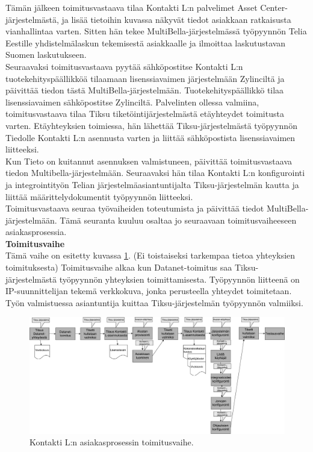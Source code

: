 \documentclass[finnish,12pt,a4paper,pdftex]{article}
\begin{document}
Tämän jälkeen toimitusvastaava tilaa Kontakti L:n palvelimet Asset Center-järjestelmästä, ja lisää tietoihin kuvassa näkyvät tiedot asiakkaan ratkaisusta vianhallintaa varten. Sitten hän tekee MultiBella-järjestelmässä työpyynnön Telia Eestille yhdistelmälaskun tekemisestä asiakkaalle ja ilmoittaa laskutustavan Suomen laskutukseen.\\

Seuraavaksi toimitusvastaava pyytää sähköpostitse Kontakti L:n tuotekehityspäällikköä tilaamaan lisenssiavaimen järjestelmään Zylinciltä ja päivittää tiedon tästä MultiBella-järjestelmään. Tuotekehityspäällikkö tilaa lisenssiavaimen sähköpostitse Zylinciltä. Palvelinten ollessa valmiina, toimitusvastaava tilaa Tiksu tiketöintijärjestelmästä etäyhteydet toimitusta varten. Etäyhteyksien toimiessa, hän lähettää Tiksu-järjestelmästä työpyynnön Tiedolle Kontakti L:n asennusta varten ja liittää sähköpostista lisenssiavaimen liitteeksi.\\

Kun Tieto on kuitannut asennuksen valmistuneen, päivittää toimitusvastaava tiedon Multibella-järjestelmään. Seuraavaksi hän tilaa Kontakti L:n konfigurointi ja integrointityön Telian järjestelmäasiantuntijalta Tiksu-järjestelmän kautta ja liittää määrittelydokumentit työpyynnön liitteeksi.\\

Toimitusvastaava seuraa työvaiheiden toteutumista ja päivittää tiedot MultiBella-järjestelmään. Tämä seuranta kuuluu osaltaa jo seuraavaan toimitusvaiheeseen asiakasprosessia.\\

\textbf{Toimitusvaihe}\\


Tämä vaihe on esitetty kuvassa \ref{fig:toimitus}. (Ei toistaiseksi tarkempaa tietoa yhteyksien toimituksesta) Toimitusvaihe alkaa kun Datanet-toimitus saa Tiksu-järjestelmästä työpyynnön yhteyksien toimittamisesta. Työpyynnön liitteenä on IP-suunnittelijan tekemä verkkokuva, jonka perusteella yhteydet toimitetaan. Työn valmistuessa asiantuntija kuittaa Tiksu-järjestelmän työpyynnön valmiiksi.\\

\begin{figure}[!h]
    \centering
    \includegraphics[scale=0.3]{images/toimitus.pdf}
    \caption{Kontakti L:n asiakasprosessin toimitusvaihe.}
    \label{fig:toimitus}
\end{figure}
\end{document}
